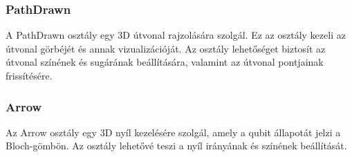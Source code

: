 \documentclass[fontsize=12pt,a4paper]{article}
\begin{document}
\subsubsection{PathDrawn}

A PathDrawn osztály egy 3D útvonal rajzolására szolgál. Ez az osztály kezeli az útvonal görbéjét és annak vizualizációját. Az osztály lehetőséget biztosít az útvonal színének és sugárának beállítására, valamint az útvonal pontjainak frissítésére.

\begin{table}[h!]
    \centering
\end{table}

\begin{table}[h!]
    \centering
\end{table}

\subsubsection{Arrow}

Az Arrow osztály egy 3D nyíl kezelésére szolgál, amely a qubit állapotát jelzi a Bloch-gömbön. Az osztály lehetővé teszi a nyíl irányának és színének beállítását.

\begin{table}[h!]
    \centering
\end{table}
\end{document}
